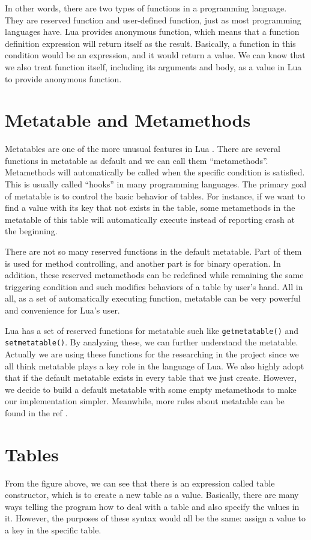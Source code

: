 In other words, there are two types of functions in a programming language. They are reserved function and user-defined function, just as most programming languages have. Lua provides anonymous function, which means that a function definition expression will return itself as the result. Basically, a function in this condition would be an expression, and it would return a value. We can know that we also treat function itself, including its arguments and body, as a value in Lua to provide anonymous function.

\section{Metatable and Metamethods}
Metatables are one of the more unusual features in Lua . There are several functions in metatable as default and we can call them ``metamethods''. Metamethods will automatically be called when the specific condition is satisfied. This is usually called ``hooks'' in many programming languages. The primary goal of metatable is to control the basic behavior of tables. For instance, if we want to find a value with its key that not exists in the table, some metamethods in the metatable of this table will automatically execute instead of reporting crash at the beginning.

There are not so many reserved functions in the default metatable. Part of them is used for method controlling, and another part is for binary operation. In addition, these reserved metamethods can be redefined while remaining the same triggering condition and such modifies behaviors of a table by user's hand. All in all, as a set of automatically executing function, metatable can be very powerful and convenience for Lua's user.

Lua has a set of reserved functions for metatable such like {\tt getmetatable()} and {\tt setmetatable()}. By analyzing these, we can further understand the metatable. Actually we are using these functions for the researching in the project since we all think metatable plays a key role in the language of Lua. We also highly adopt that if the default metatable exists in every table that we just create. However, we decide to build a default metatable with some empty metamethods to make our implementation simpler. Meanwhile, more rules about metatable can be found in the ref \cite{LRM}.

\section{Tables}
From the figure above, we can see that there is an expression called table constructor, which is to create a new table as a value. Basically, there are many ways telling the program how to deal with a table and also specify the values in it. However, the purposes of these syntax would all be the same: assign a value to a key in the specific table.

